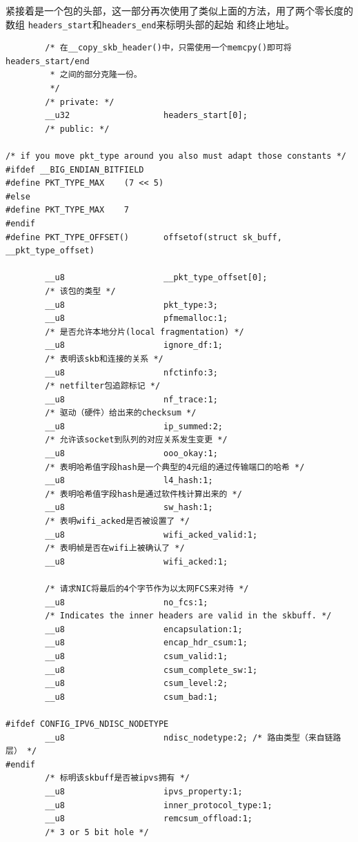 \documentclass[11pt, a4paper,oneside]{book}
\theoremstyle{ocrenumbox}
\theoremstyle{purplenumbox}
\theoremstyle{blackbox}
\begin{document}
紧接着是一个包的头部，这一部分再次使用了类似上面的方法，用了两个零长度的数组
\texttt{headers_start}和\texttt{headers_end}来标明头部的起始
和终止地址。
\begin{verbatim}
        /* 在__copy_skb_header()中，只需使用一个memcpy()即可将headers_start/end
         * 之间的部分克隆一份。
         */
        /* private: */
        __u32                   headers_start[0];
        /* public: */

/* if you move pkt_type around you also must adapt those constants */
#ifdef __BIG_ENDIAN_BITFIELD
#define PKT_TYPE_MAX    (7 << 5)
#else
#define PKT_TYPE_MAX    7
#endif
#define PKT_TYPE_OFFSET()       offsetof(struct sk_buff, __pkt_type_offset)

        __u8                    __pkt_type_offset[0];
        /* 该包的类型 */
        __u8                    pkt_type:3;
        __u8                    pfmemalloc:1;
        /* 是否允许本地分片(local fragmentation) */
        __u8                    ignore_df:1; 
        /* 表明该skb和连接的关系 */
        __u8                    nfctinfo:3;
        /* netfilter包追踪标记 */
        __u8                    nf_trace:1;
        /* 驱动（硬件）给出来的checksum */
        __u8                    ip_summed:2;
        /* 允许该socket到队列的对应关系发生变更 */
        __u8                    ooo_okay:1;
        /* 表明哈希值字段hash是一个典型的4元组的通过传输端口的哈希 */
        __u8                    l4_hash:1;
        /* 表明哈希值字段hash是通过软件栈计算出来的 */
        __u8                    sw_hash:1;
        /* 表明wifi_acked是否被设置了 */
        __u8                    wifi_acked_valid:1;
        /* 表明帧是否在wifi上被确认了 */
        __u8                    wifi_acked:1;
        
        /* 请求NIC将最后的4个字节作为以太网FCS来对待 */
        __u8                    no_fcs:1;
        /* Indicates the inner headers are valid in the skbuff. */
        __u8                    encapsulation:1;
        __u8                    encap_hdr_csum:1;
        __u8                    csum_valid:1;
        __u8                    csum_complete_sw:1;
        __u8                    csum_level:2;
        __u8                    csum_bad:1;

#ifdef CONFIG_IPV6_NDISC_NODETYPE
        __u8                    ndisc_nodetype:2; /* 路由类型（来自链路层） */
#endif
        /* 标明该skbuff是否被ipvs拥有 */
        __u8                    ipvs_property:1;
        __u8                    inner_protocol_type:1;
        __u8                    remcsum_offload:1;
        /* 3 or 5 bit hole */


\end{verbatim}
\end{document}
